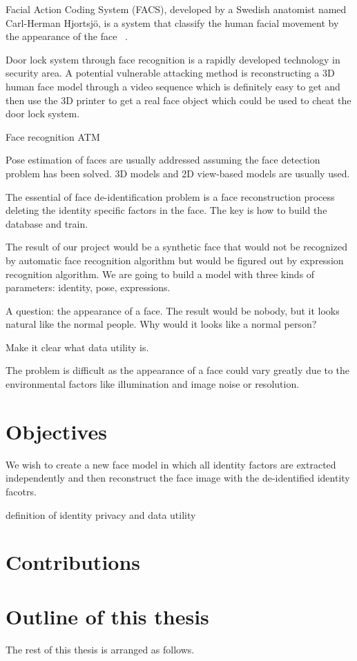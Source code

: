 Facial Action Coding System (FACS), developed by a Swedish anatomist named Carl-Herman Hjortsjö, is a system that classify the human facial movement by the appearance of the face ~\cite{facs70}. 


\par
Door lock system through face recognition is a rapidly developed technology in security area. A potential vulnerable attacking method is reconstructing a 3D human face model through a video sequence which is definitely easy to get and then use the 3D printer to get a real face object which could be used to cheat the door lock system. 

Face recognition ATM



Pose estimation of faces are usually addressed assuming the face detection problem has been solved. 3D models and 2D view-based models are usually used. 


The essential of face de-identification problem is a face reconstruction process deleting the identity specific factors in the face.  
The key is how to build the database and train. 

The result of our project would be a synthetic face that would not be recognized by automatic face recognition algorithm but would be figured out by expression recognition algorithm. We are going to build a model with three kinds of parameters: identity, pose, expressions. 

A question: the appearance of a face. The result would be nobody, but it looks natural like the normal people. Why would it looks like a normal person?

Make it clear what data utility is. 

The problem is difficult as the appearance of a face could vary greatly due to the environmental factors like illumination and image noise or resolution. 

\section{Objectives}
We wish to create a new face model in which all identity factors are extracted independently and then reconstruct the face image with the de-identified identity facotrs. 

definition of identity privacy and data utility

\section{Contributions}
\par


\section{Outline of this thesis}
\par 
The rest of this thesis is arranged as follows. 
